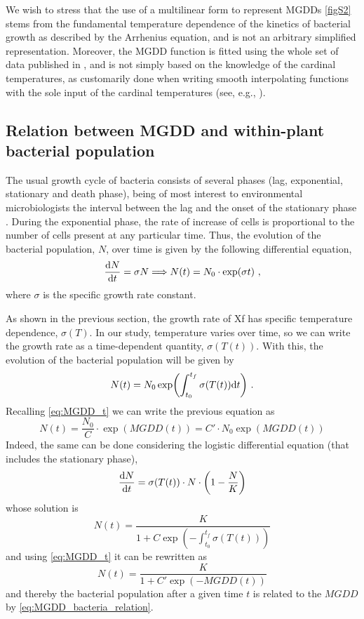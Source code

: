 We wish to stress that the use of a multilinear form to represent MGDDs
\cref{figS2} stems from the fundamental temperature dependence of the kinetics
of bacterial growth as described by the Arrhenius equation, and is not an
arbitrary simplified representation. Moreover, the MGDD function is fitted
using the whole set of data published in \cite{Feil2001}, and is not simply
based on the knowledge of the cardinal temperatures, as customarily done when
writing smooth interpolating functions with the sole input of the cardinal
temperatures (see, e.g., \cite{Yan1999}).

\subsection{Relation between MGDD and within-plant bacterial
    population}\label{app:MGDD_growth} %

The usual growth cycle of bacteria consists of several phases (lag,
exponential, stationary and death phase), being of most interest to
environmental microbiologists the interval between the lag and the onset of the
stationary phase  \cite{MAIER200937}. During the exponential phase, the rate of
increase of cells is proportional to the number of cells present at any
particular time. Thus, the evolution of the bacterial population, $N$, over
time is given by the following differential equation,
\begin{equation}
    \frac{\mathrm{d} N}{\mathrm{d} t}=\sigma N \Longrightarrow N(t)=N_0\cdot\exp(\sigma t) \ ,
\end{equation}
where $\sigma$ is the specific growth rate constant.

As shown in the previous section, the growth rate of Xf has specific
temperature dependence, $\sigma(T)$. In our study, temperature varies over
time, so we can write the growth rate as a time-dependent quantity,
$\sigma(T(t))$. With this, the evolution of the bacterial population will be
given by
\begin{equation}
    N(t)=N_0\exp(\int_{t_0}^{t_f}\sigma(T(t)) \mathrm{d} t) \ .
\end{equation}
Recalling \cref{eq:MGDD_t} we can write the previous equation as
\begin{equation}
    N(t)=\frac{N_0}{C}\cdot\exp(MGDD(t))=C'\cdot N_0\exp(MGDD(t))
\end{equation}
Indeed, the same can be done considering the logistic differential equation
(that includes the stationary phase),
\begin{equation}
    \frac{\mathrm{d} N}{\mathrm{d} t}=\sigma(T(t))\cdot N\cdot\left(1-\frac{N}{K}\right)
\end{equation}
whose solution is
\begin{equation}
    N(t)=\frac{K}{1+C\exp(-\int_{t_0}^{t_f}\sigma(T(t)))}
\end{equation}
and using \cref{eq:MGDD_t} it can be rewritten as
\begin{equation}\label{eq:MGDD_bacteria_relation}
    N(t)=\frac{K}{1+C'\exp(-MGDD(t))}
\end{equation}
and thereby the bacterial population after a given time $t$ is related to
the $MGDD$ by \cref{eq:MGDD_bacteria_relation}.\\

